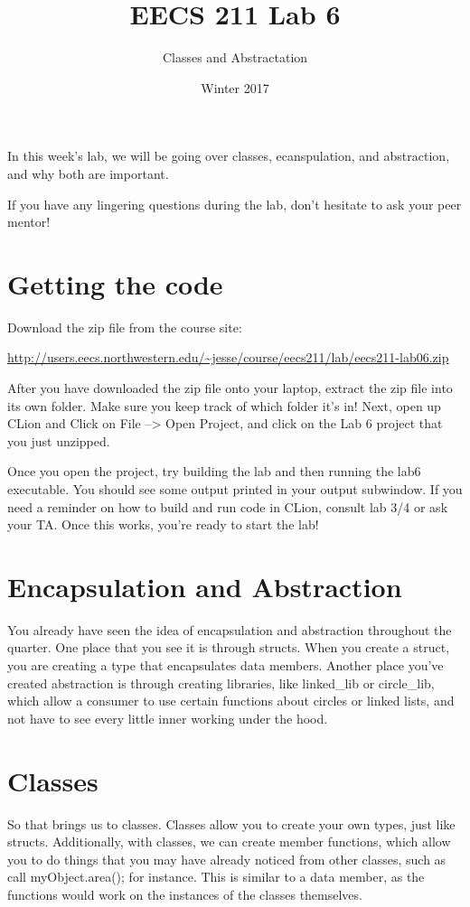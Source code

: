 \documentclass{tufte-handout}
\title{EECS 211 Lab 6}
\author{Classes and Abstractation}
\date{Winter 2017}
\begin{document}
\maketitle

In this week's lab, we will be going over classes, ecanspulation, and abstraction, and why both are important.

If you have any lingering questions during the lab, don't hesitate to ask your peer mentor!
\section{Getting the code}
Download the zip file from the course site: \medskip

\url{http://users.eecs.northwestern.edu/~jesse/course/eecs211/lab/eecs211-lab06.zip}

\medskip \noindent
After you have downloaded the zip file onto your laptop, extract the zip file into its own folder. Make sure you keep track of which folder it's in!  Next, open up CLion and Click on File --> Open Project, and click on the Lab 6 project that you just unzipped. 

Once you open the project, try building the lab and then running the lab6 executable. 
You should see some output printed in your output subwindow.
If you need a reminder on how to build and run code in CLion, consult lab 3/4 or ask your TA.
Once this works, you're ready to start the lab!

\section{Encapsulation and Abstraction}
You already have seen the idea of encapsulation and abstraction throughout the quarter.
One place that you see it is through structs.
When you create a struct, you are creating a type that encapsulates data members.
Another place you've created abstraction is through creating libraries, like linked\_lib or circle\_lib, which allow a consumer to use certain functions about circles or linked lists, and not have to see every little inner working under the hood.

\section{Classes}
So that brings us to classes.  
Classes allow you to create your own types, just like structs.
Additionally, with classes, we can create member functions, which allow you to do things that you may have already noticed from other classes, such as call myObject.area(); for instance.
This is similar to a data member, as the functions would work on the instances of the classes themselves.  
\end{document}
